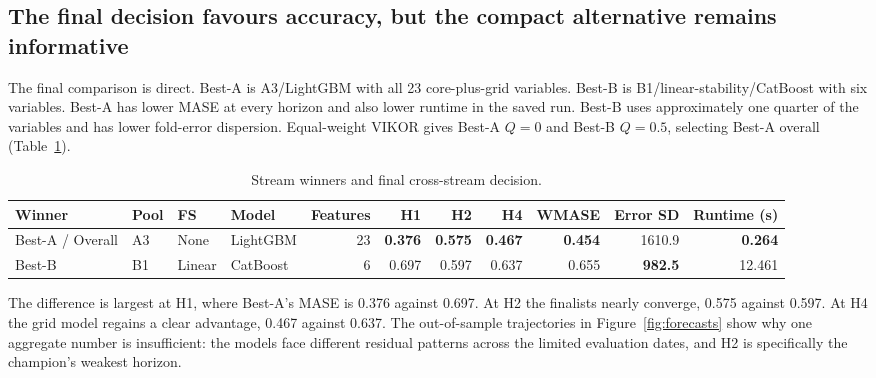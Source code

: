 \documentclass[preprint,12pt]{elsarticle}
\begin{document}
\subsection{The final decision favours accuracy, but the compact alternative remains informative}

The final comparison is direct. Best-A is A3/LightGBM with all 23 core-plus-grid variables. Best-B is B1/linear-stability/CatBoost with six variables. Best-A has lower MASE at every horizon and also lower runtime in the saved run. Best-B uses approximately one quarter of the variables and has lower fold-error dispersion. Equal-weight VIKOR gives Best-A $Q=0$ and Best-B $Q=0.5$, selecting Best-A overall (Table~\ref{tab:finalists}).

\begin{table}[!htbp]
\centering
\caption{Stream winners and final cross-stream decision.}
\label{tab:finalists}
\begin{adjustbox}{max width=\textwidth}
\begin{tabular}{@{}llllrrrrrrr@{}}
\toprule
Winner & Pool & FS & Model & Features & H1 & H2 & H4 & WMASE & Error SD & Runtime (s) \\
\midrule
Best-A / Overall & A3 & None & LightGBM & 23 & \textbf{0.376} & \textbf{0.575} & \textbf{0.467} & \textbf{0.454} & 1610.9 & \textbf{0.264} \\
Best-B & B1 & Linear & CatBoost & 6 & 0.697 & 0.597 & 0.637 & 0.655 & \textbf{982.5} & 12.461 \\
\bottomrule
\end{tabular}
\end{adjustbox}
\end{table}

The difference is largest at H1, where Best-A's MASE is 0.376 against 0.697. At H2 the finalists nearly converge, 0.575 against 0.597. At H4 the grid model regains a clear advantage, 0.467 against 0.637. The out-of-sample trajectories in Figure~\ref{fig:forecasts} show why one aggregate number is insufficient: the models face different residual patterns across the limited evaluation dates, and H2 is specifically the champion's weakest horizon.
\end{document}
